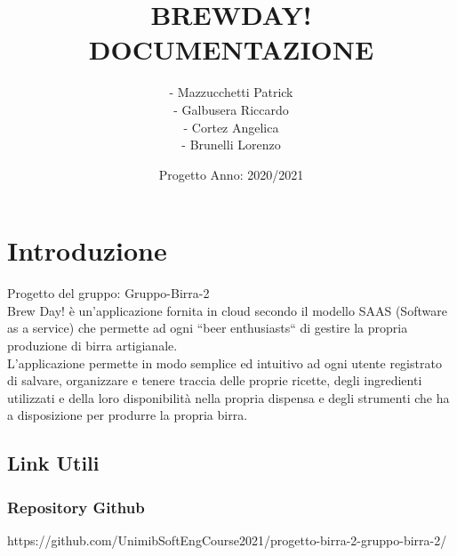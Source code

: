 \documentclass{article}
\title{BREWDAY!\\
DOCUMENTAZIONE}
\author {- Mazzucchetti Patrick\\ 
- Galbusera Riccardo\\
- Cortez Angelica\\
- Brunelli  Lorenzo
}
\date{Progetto Anno: 2020/2021}
\begin{document}
\maketitle
\clearpage
\tableofcontents
\break
\section{Introduzione}
Progetto del gruppo: Gruppo-Birra-2\\
Brew Day! è un’applicazione fornita in cloud secondo il modello SAAS (Software as a service) che permette ad ogni “beer enthusiasts“ di gestire
la propria produzione di birra artigianale.\\
L’applicazione permette in modo semplice ed intuitivo ad ogni utente registrato di salvare, organizzare e tenere traccia delle proprie ricette, degli
ingredienti utilizzati e della loro disponibilità nella propria dispensa e degli strumenti che ha a disposizione per produrre la propria birra.\\
\clearpage
\subsection{Link Utili}
\subsubsection{Repository Github}
https://github.com/UnimibSoftEngCourse2021/progetto-birra-2-gruppo-birra-2/
\end{document}
